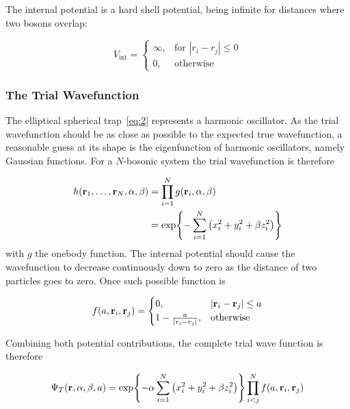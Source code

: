 The internal potential is a hard shell potential, being infinite for distances
where two bosons overlap:

\begin{equation*}
  V_{\text{int}} = \begin{cases}
    \infty, &\text{for } |r_{i} - r_{j}| \le 0\\
    0, &\text{otherwise}
    \end{cases}
\end{equation*}

\subsubsection{The Trial Wavefunction}

The elliptical spherical trap~\eqref{eq:2} represents a harmonic oscillator. As
the trial wavefunction should be as close as possible to the expected true
wavefunction, a reasonable guess at its shape is the eigenfunction of
harmonic oscillators, namely Gaussian functions. For a \(N\)-bosonic system the
trial wavefunction is therefore

\begin{align*}
  h(\vb{r}_{1}, \ldots, \vb{r}_{N}, \alpha, \beta) &= \prod_{i=1}^{N}g(\vb{r}_{i}, \alpha, \beta)\\
  &= \exp{-\sum_{i=1}^{N}\left( x_{i}^{2} + y_{i}^{2}+\beta z_{i}^{2} \right)}
\end{align*}
with \(g\) the onebody function.
The internal potential should cause the wavefunction to decrease continuously
down to zero as the distance of two particles goes to zero. Once such possible
function is

\begin{equation*}
  f(a, \vb{r}_{i}, \vb{r}_{j}) = \begin{cases}
    0, &|\vb{r}_{i} - \vb{r}_{j}| \le a\\
    1 - \frac{a}{\abs{r_{i}-r_{j}}}, &\text{otherwise}
    \end{cases}
\end{equation*}

Combining both potential contributions, the complete trial wave function is
therefore

\begin{equation*}
  \Psi_{T}(\vb{r}, \alpha, \beta, a) = \exp{-\alpha\sum_{i=1}^{N}\left( x_{i}^{2} + y^{2}_{i} + \beta z^{2}_{i} \right)}
  \prod_{i<j}^{N}f(a, \vb{r}_{i}, \vb{r}_{j})
\end{equation*}

